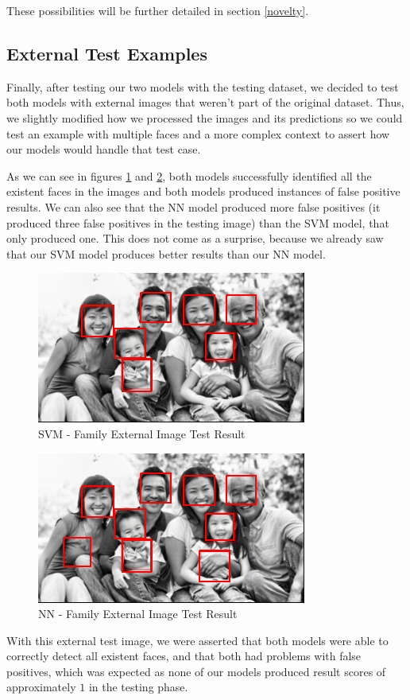 These possibilities will be further detailed in section \ref{novelty}.

\subsection{External Test Examples}

Finally, after testing our two models with the testing dataset, we decided to test both models with external images that weren't part of the original dataset. Thus, we slightly modified how we processed the images and its predictions so we could test an example with multiple faces and a more complex context to assert how our models would handle that test case.

As we can see in figures \ref{fig:svm-family-result} and \ref{fig:nn-family-result}, both models successfully identified all the existent faces in the images and both models produced instances of false positive results. We can also see that the NN model produced more false positives (it produced three false positives in the testing image) than the SVM model, that only produced one. This does not come as a surprise, because we already saw that our SVM model produces better results than our NN model.

\begin{figure}[htbp]
\centerline{\includegraphics[width=1\linewidth]{images/svm_persons.png}}
\caption{SVM - Family External Image Test Result}
\label{fig:svm-family-result}
\end{figure}

\begin{figure}[htbp]
\centerline{\includegraphics[width=1\linewidth]{images/nn_persons.png}}
\caption{NN - Family External Image Test Result}
\label{fig:nn-family-result}
\end{figure}

With this external test image, we were asserted that both models were able to correctly detect all existent faces, and that both had problems with false positives, which was expected as none of our models produced result scores of approximately \(1\) in the testing phase.